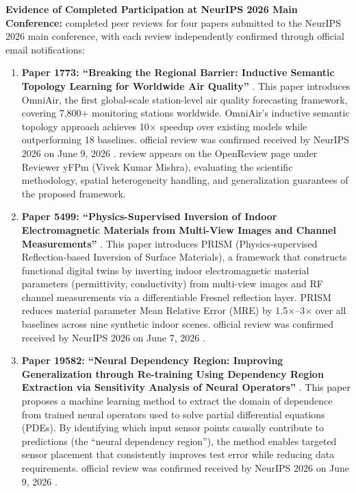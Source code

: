 \textbf{Evidence of Completed Participation at NeurIPS 2026 Main Conference:} \dr completed peer reviews for four papers submitted to the NeurIPS 2026 main conference, with each review independently confirmed through official email notifications:

\begin{enumerate}
    \item \textbf{Paper 1773: ``Breaking the Regional Barrier: Inductive Semantic Topology Learning for Worldwide Air Quality''} \cite{JR38}. This paper introduces OmniAir, the first global-scale station-level air quality forecasting framework, covering 7,800+ monitoring stations worldwide. OmniAir's inductive semantic topology approach achieves 10$\times$ speedup over existing models while outperforming 18 baselines. \drs official review was confirmed received by NeurIPS 2026 on June 9, 2026 \cite{JR39}. \drs review appears on the OpenReview page under Reviewer yFPm (Vivek Kumar Mishra), evaluating the scientific methodology, spatial heterogeneity handling, and generalization guarantees of the proposed framework.

    \item \textbf{Paper 5499: ``Physics-Supervised Inversion of Indoor Electromagnetic Materials from Multi-View Images and Channel Measurements''} \cite{JR40}. This paper introduces PRISM (Physics-supervised Reflection-based Inversion of Surface Materials), a framework that constructs functional digital twins by inverting indoor electromagnetic material parameters (permittivity, conductivity) from multi-view images and RF channel measurements via a differentiable Fresnel reflection layer. PRISM reduces material parameter Mean Relative Error (MRE) by 1.5$\times$--3$\times$ over all baselines across nine synthetic indoor scenes. \drs official review was confirmed received by NeurIPS 2026 on June 7, 2026 \cite{JR41}.

    \item \textbf{Paper 19582: ``Neural Dependency Region: Improving Generalization through Re-training Using Dependency Region Extraction via Sensitivity Analysis of Neural Operators''} \cite{JR42}. This paper proposes a machine learning method to extract the domain of dependence from trained neural operators used to solve partial differential equations (PDEs). By identifying which input sensor points causally contribute to predictions (the ``neural dependency region''), the method enables targeted sensor placement that consistently improves test error while reducing data requirements. \drs official review was confirmed received by NeurIPS 2026 on June 9, 2026 \cite{JR43}.


\end{enumerate}
